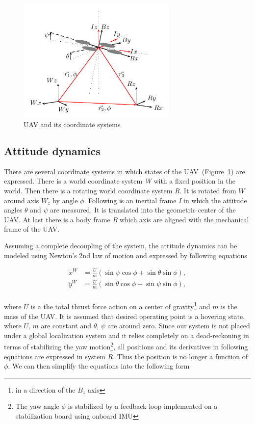 \begin{figure}[!h]
\centering
\includegraphics[width=0.7\textwidth]{fig/coordinate_system.pdf}
\caption{UAV and its coordinate systems}
\label{fig:coordinate_system}
\end{figure}

\subsection{Attitude dynamics}

There are several coordinate systems in which states of the UAV~(Figure~\ref{fig:coordinate_system}) are expressed. There is a world coordinate system \textit{W} with a fixed position in the world. Then there is a rotating world coordinate system \textit{R}. It is rotated from $W$ around axis $W_z$ by angle $\phi$. Following is an inertial frame \textit{I} in which the attitude angles $\theta$ and $\psi$ are measured. It is translated into the geometric center of the UAV. At last there is a body frame \textit{B} which axis are aligned with the mechanical frame of the UAV.

Assuming a complete decoupling of the system, the attitude dynamics can be modeled using Newton's 2nd law of motion and expressed by following equations

\begin{equation}
\begin{split}
\ddot{x}^W &= \frac{U}{m}\left(\sin\psi\cos\phi + \sin\theta\sin\phi\right),\\
\ddot{y}^W &= \frac{U}{m}\left(\sin\theta\cos\phi + \sin\psi\sin\phi\right),\\
\end{split}
\end{equation}

where $U$ is a the total thrust force action on a center of gravity\footnote{in a direction of the $B_z$ axis} and $m$ is the mass of the UAV. It is assumed that desired operating point is a hovering state, where $U$, $m$ are constant and $\theta$, $\psi$ are around zero. Since our system is not placed under a global localization system and it relies completely on a dead-reckoning in terms of stabilizing the yaw motion\footnote{The yaw angle $\phi$ is stabilized by a feedback loop implemented on a stabilization board using onboard IMU}, all positions and its derivatives in following equations are expressed in system $R$. Thus the position is no longer a function of $\phi$. We can then simplify the equations into the following form

